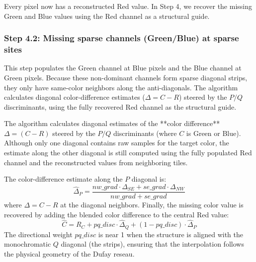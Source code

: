 \documentclass[a4paper,11pt]{article}
\newcommand{\tile}[6][]{%
  \if#4r\def\tilecol{cfared}\else
    \if#4g\def\tilecol{cfagreen}\else
      \if#4b\def\tilecol{cfablue}\else
        \def\tilecol{cfagrey}\fi\fi\fi
  \node[cfa-tile, fill=\tilecol!60, #1] (T#2#3) at (#2*0.8, -#3*0.8) {};
  \ifx&#5&\else\node[cfa-coords, above=0pt of T#2#3] {#5};\fi
  \ifx&#6&\else\node[cfa-weight] at (T#2#3) {#6};\fi
}
\newcommand{\dufaytile}[5][]{%
  \pgfmathtruncatemacro{\cfas}{mod(int(#2)+int(#3),4)}%
  \ifcase\cfas\tile[#1]{#2}{#3}{g}{#4}{#5}%
  \or\tile[#1]{#2}{#3}{r}{#4}{#5}%
  \or\tile[#1]{#2}{#3}{b}{#4}{#5}%
  \or\tile[#1]{#2}{#3}{r}{#4}{#5}\fi
}
\begin{document}
Every pixel now has a reconstructed Red value. In Step 4, we recover the missing Green and Blue values using the Red channel as a structural guide.

\subsubsection{Step 4.2: Missing sparse channels (Green/Blue) at sparse sites}
This step populates the Green channel at Blue pixels and the Blue channel at Green pixels. Because these non-dominant channels form sparse diagonal strips, they only have same-color neighbors along the anti-diagonals. The algorithm calculates diagonal color-difference estimates ($\Delta = C - R$) steered by the $P/Q$ discriminants, using the fully recovered Red channel as the structural guide.

\begin{center}
\end{center}

The algorithm calculates diagonal estimates of the **color difference** $\Delta = (C - R)$ steered by the $P/Q$ discriminants (where $C$ is Green or Blue). Although only one diagonal contains raw samples for the target color, the estimate along the other diagonal is still computed using the fully populated Red channel and the reconstructed values from neighboring tiles.

The color-difference estimate along the $P$ diagonal is:
\[
    \hat{\Delta}_{P} = \frac{nw\_grad \cdot \Delta_{SE} + se\_grad \cdot \Delta_{NW}}{nw\_grad + se\_grad}
\]
where $\Delta = C - R$ at the diagonal neighbors. Finally, the missing color value is recovered by adding the blended color difference to the central Red value:
\[
    \hat{C} = R_C + pq\_disc \cdot \hat{\Delta}_Q + (1 - pq\_disc) \cdot \hat{\Delta}_P
\]
The directional weight $pq\_disc$ is near 1 when the structure is aligned with the monochromatic $Q$ diagonal (the strips), ensuring that the interpolation follows the physical geometry of the Dufay reseau.
\end{document}
